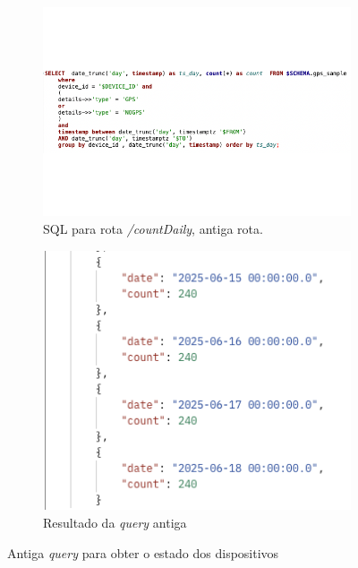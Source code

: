 \begin{figure}[!h]
	\centering
	\begin{subfigure}[c]{0.45\textwidth}
		\centering
		\includegraphics[width=\textwidth]{figs/sqlCountDaily.png}
		\caption{SQL para rota \textit{/countDaily}, antiga rota.}
		\label{fig:sqlCountDaily}
	\end{subfigure}
	\hfill
	\begin{subfigure}[c]{0.45\textwidth}
        \centering
        \includegraphics[width=\textwidth]{figs/return_old_query.png}
		\caption{Resultado da \textit{query} antiga}
        \label{fig:returnOldQuery}
	\end{subfigure}
	\caption{Antiga \textit{query} para obter o estado dos dispositivos}
\end{figure}


